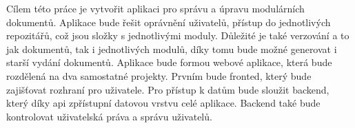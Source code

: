 Cílem této práce je vytvořit aplikaci pro správu a úpravu modulárních dokumentů. Aplikace bude řešit oprávnění uživatelů, přístup do
jednotlivých repozitářů, což jsou složky s jednotlivými moduly. Důležité je také verzování a to jak dokumentů, tak i jednotlivých modulů, díky tomu
bude možné generovat i starší vydání dokumentů. Aplikace bude formou webové aplikace, která bude rozdělená na dva samostatné projekty.
Prvním bude fronted, který bude zajišťovat rozhraní pro uživatele. Pro přístup k datům bude sloužit backend, který díky api zpřístupní datovou vrstvu
celé aplikace. Backend také bude kontrolovat uživatelská práva a správu uživatelů.
